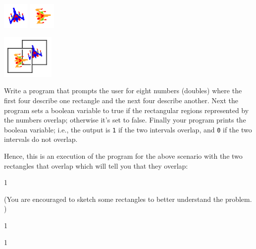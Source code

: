 \begin{center}
\includegraphics[width=0.5in]{a06q05/question/figure3.png}
\includegraphics[width=0.5in]{a06q05/question/figure4.png}
\end{center}

\begin{center}
\includegraphics[width=1in]{a06q05/question/figure5.png}
\end{center}

Write a program that prompts the user for eight numbers (doubles) where the 
first four describe one rectangle and the next four describe another. Next the 
program sets a boolean variable to true if the rectangular regions represented 
by the numbers overlap; otherwise it's set to false. Finally your program 
prints the boolean variable; i.e., the output is \verb!1! if the two intervals 
overlap, and \verb!0! if the two intervals do not overlap.

Hence, this is an execution of the program for the above scenario with the two
rectangles that overlap which will tell you that they overlap:
\begin{console}[commandchars=\\\{\}]
1
\end{console}

(You are encouraged to sketch some rectangles to better understand the problem.
)

\resett
\nextt
\begin{console}[commandchars=\\\{\}]
1
\end{console}

\nextt
\begin{console}[commandchars=\\\{\}]
1
\end{console}

